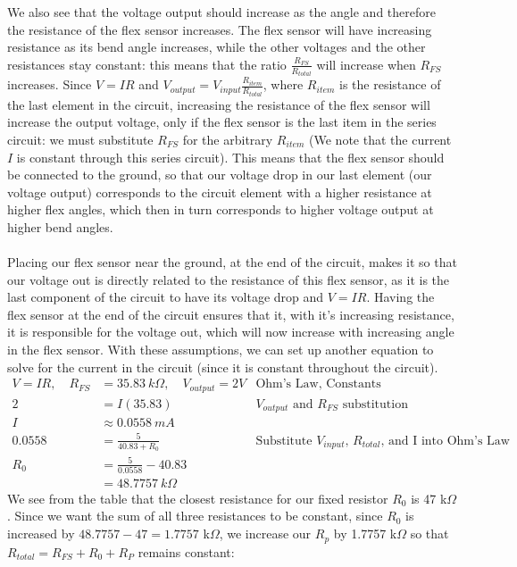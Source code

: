 \documentclass[12pt, a4paper]{article}
\begin{document}
\begin{enumerate}
We also see that the voltage output should increase as the angle and therefore the resistance of the flex sensor increases. The flex sensor will have increasing resistance as its bend angle increases, while the other voltages and the other resistances stay constant: this means that the ratio $\frac{R_{FS}}{R_{total}}$ will increase when $R_{FS}$ increases. Since $V = IR$ and $V_{output} = V_{input} \frac{R_{item}}{R_{total}}$, where $R_{item}$ is the resistance of the last element in the circuit, increasing the resistance of the flex sensor will increase the output voltage, only if the flex sensor is the last item in the series circuit: we must substitute $R_{FS}$ for the arbitrary $R_{item}$ (We note that the current $I$ is constant through this series circuit). This means that the flex sensor should be connected to the ground, so that our voltage drop in our last element (our voltage output) corresponds to the circuit element with a higher resistance at higher flex angles, which then in turn corresponds to higher voltage output at higher bend angles. \\ \\
Placing our flex sensor near the ground, at the end of the circuit, makes it so that our voltage out is directly related to the resistance of this flex sensor, as it is the last component of the circuit to have its voltage drop and $ V = IR$. Having the flex sensor at the end of the circuit ensures that it, with it's increasing resistance, it is responsible for the voltage out, which will now increase with increasing angle in the flex sensor. With these assumptions, we can set up another equation to solve for the current in the circuit (since it is constant throughout the circuit). \\ 
\begin{align*}
V = IR , \quad R_{FS} &= 35.83 \ k\Omega, \quad V_{output} = 2 V &\text{Ohm's Law, Constants}\\
2 &= I (35.83) &\text{$V_{output}$ and $R_{FS}$ substitution} \\
I &\approx 0.0558 \  mA\\
0.0558 &= \frac{5}{40.83 + R_0} &\text{Substitute $V_{input}$, $R_{total}$, and I into Ohm's Law}\\
R_0 &= \frac{5}{0.0558} - 40.83 \\ 
		&= 48.7757 \ k \Omega
\end{align*}
We see from the table that the closest resistance for our fixed resistor $R_0$ is 47 k$\Omega$. Since we want the sum of all three resistances to be constant, since $R_0$ is increased by $48.7757 - 47 = 1.7757$ k$\Omega$, we increase our $R_p$ by 1.7757 k$\Omega$ so that $R_{total} = R_{FS} + R_0 + R_P$ remains constant: 

\end{enumerate}
\end{document}
